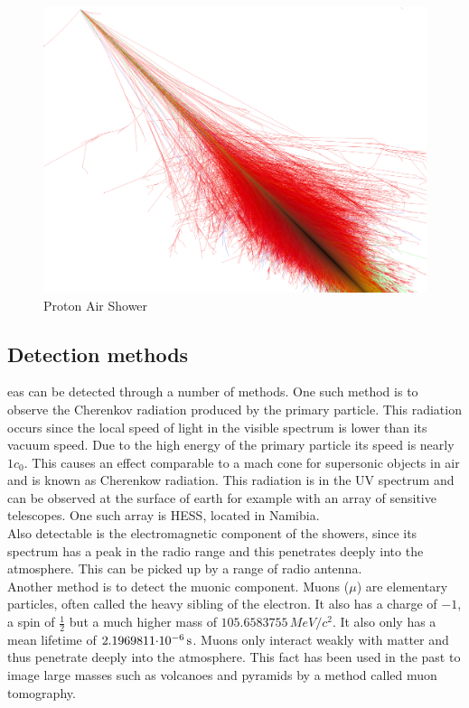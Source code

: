 \documentclass[abstract,toc,los,english,11pt,glossaries]{jluthesis}
\begin{document}
\begin{figure}[ht!]
	\centering
	\includegraphics[width=0.8\linewidth]{data/shower-45}
	\caption{Proton Air Shower \cite{corsika-images}}
	\label{fig:proton-shower}
\end{figure}
\subsection{Detection methods}
\acrshort{eas} can be detected through a number of methods. One such method is to observe the Cherenkov radiation produced by the primary particle. This radiation occurs since the local speed of light in the visible spectrum is lower than its vacuum speed. Due to the high energy of the primary particle its speed is nearly $1c_0$. This causes an effect comparable to a mach cone for supersonic objects in air and is known as Cherenkow radiation. This radiation is in the UV spectrum and can be observed at the surface of earth for example with an array of sensitive telescopes. One such array is HESS, located in Namibia. \\
Also detectable is the electromagnetic component of the showers, since its spectrum has a peak in the radio range and this penetrates deeply into the atmosphere. This can be picked up by a range of radio antenna. \\
Another method is to detect the muonic component. Muons ($\mu$) are elementary particles, often called the heavy sibling of the electron. It also has a charge of $-1$, a spin of $\frac{1}{2}$ but a much higher mass of
$105.6583755\,\si{MeV/c^2}$. It also only has a mean lifetime of $\snsi{2.1969811}{-6}{s}$. Muons only interact weakly with matter and thus penetrate deeply into the atmosphere. This fact has been used in the past to image large masses such as volcanoes and pyramids by a method called muon tomography.
\end{document}
